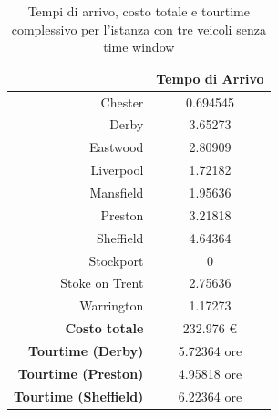 
		\begin{table}[H]
			\tiny
			\centering
			\begin{tabular}{rc}

				\toprule
				& Tempo di Arrivo \\

				\midrule
				Chester & 0.694545 \\
				Derby & 3.65273 \\
				Eastwood & 2.80909 \\
				Liverpool & 1.72182 \\
				Mansfield & 1.95636 \\
				Preston  & 3.21818 \\
				Sheffield & 4.64364 \\
				Stockport & 0 \\
				Stoke on Trent & 2.75636 \\
				Warrington & 1.17273 \\
				\midrule
				\textbf{Costo totale} & 232.976 € \\
				\textbf{Tourtime (Derby)} & 5.72364 ore \\
				\textbf{Tourtime (Preston)} & 4.95818 ore \\
				\textbf{Tourtime (Sheffield)} & 6.22364 ore \\
				\bottomrule
			\end{tabular}
			\label{table:instance_3_totale}
			\caption{Tempi di arrivo, costo totale e tourtime complessivo per l'istanza con tre veicoli senza time window}
		\end{table}


